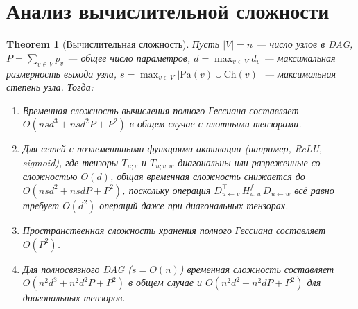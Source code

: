 \documentclass[11pt]{article}
\newtheorem{theorem}{Theorem}
\newcommand{\Pa}{\mathrm{Pa}} %
\newcommand{\Ch}{\mathrm{Ch}} %
\begin{document}
\section{Анализ вычислительной сложности}

\begin{theorem}[Вычислительная сложность]
  Пусть $|V|=n$ — число узлов в DAG, $P = \sum_{v \in V} p_v$ — общее число параметров, $d = \max_{v \in V}
  d_v$ — максимальная размерность выхода узла, $s = \max_{v \in V} |\Pa(v) \cup \Ch(v)|$ — максимальная
  степень узла. Тогда:

  \begin{enumerate}
    \item Временная сложность вычисления полного Гессиана составляет $O(n s d^3 + n s d^2 P + P^2)$ в общем
      случае с плотными тензорами.
    \item Для сетей с поэлементными функциями активации (например, ReLU, sigmoid), где тензоры $T_{u;v}$ и
      $T_{u;v,w}$ диагональны или разреженные со сложностью $O(d)$, общая временная сложность снижается до
      $O(n s d^2 + n s d P + P^2)$, поскольку операция $D_{u\gets v}^\top\,H^f_{u,u}\,D_{u\gets w}$ всё равно
      требует $O(d^2)$ операций даже при диагональных тензорах.
    \item Пространственная сложность хранения полного Гессиана составляет $O(P^2)$.
    \item Для полносвязного DAG ($s = O(n)$) временная сложность составляет $O(n^2 d^3 + n^2 d^2 P + P^2)$ в
      общем случае и $O(n^2 d^2 + n^2 d P + P^2)$ для диагональных тензоров.
  \end{enumerate}
\end{theorem}
\end{document}

